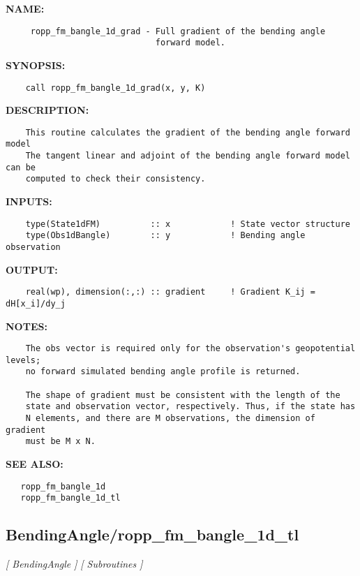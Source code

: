 \label{ch:robo5}
\label{ch:BendingAngle_ropp_fm_bangle_1d_grad}
\textbf{NAME:}\hspace{0.08in}\begin{Verbatim}
     ropp_fm_bangle_1d_grad - Full gradient of the bending angle 
                              forward model.
\end{Verbatim}
\textbf{SYNOPSIS:}\hspace{0.08in}\begin{Verbatim}
    call ropp_fm_bangle_1d_grad(x, y, K)
\end{Verbatim}
\textbf{DESCRIPTION:}\hspace{0.08in}\begin{Verbatim}
    This routine calculates the gradient of the bending angle forward model
    The tangent linear and adjoint of the bending angle forward model can be 
    computed to check their consistency.
\end{Verbatim}
\textbf{INPUTS:}\hspace{0.08in}\begin{Verbatim}
    type(State1dFM)          :: x            ! State vector structure
    type(Obs1dBangle)        :: y            ! Bending angle observation 
\end{Verbatim}
\textbf{OUTPUT:}\hspace{0.08in}\begin{Verbatim}
    real(wp), dimension(:,:) :: gradient     ! Gradient K_ij = dH[x_i]/dy_j
\end{Verbatim}
\textbf{NOTES:}\hspace{0.08in}\begin{Verbatim}
    The obs vector is required only for the observation's geopotential levels;
    no forward simulated bending angle profile is returned.

    The shape of gradient must be consistent with the length of the
    state and observation vector, respectively. Thus, if the state has
    N elements, and there are M observations, the dimension of gradient
    must be M x N.
\end{Verbatim}
\textbf{SEE ALSO:}\hspace{0.08in}\begin{Verbatim}
   ropp_fm_bangle_1d
   ropp_fm_bangle_1d_tl
\end{Verbatim}
\subsection{BendingAngle/ropp\_fm\_bangle\_1d\_tl}
\textsl{[ BendingAngle ]}
\textsl{[ Subroutines ]}

